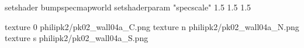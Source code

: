 setshader bumpspecmapworld
setshaderparam "specscale" 1.5 1.5 1.5

texture 0 philipk2/pk02_wall04a_C.png
texture n philipk2/pk02_wall04a_N.png
texture s philipk2/pk02_wall04a_S.png

